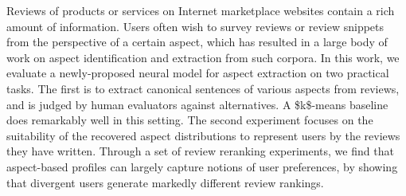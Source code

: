 Reviews of products or services on Internet marketplace websites contain a rich amount of information. Users often wish to survey reviews or review snippets from the perspective of a certain aspect, which has resulted in a large body of work on aspect identification and extraction from such corpora. In this work, we evaluate a newly-proposed neural model for aspect extraction on two practical tasks. The first is to extract canonical sentences of various aspects from reviews, and is judged by human evaluators against alternatives. A \$k\$-means baseline does remarkably well in this setting. The second experiment focuses on the suitability of the recovered aspect distributions to represent users by the reviews they have written. Through a set of review reranking experiments, we find that aspect-based profiles can largely capture notions of user preferences, by showing that divergent users generate markedly different review rankings.
